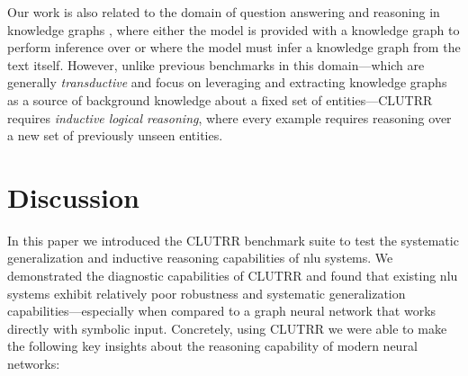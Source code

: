 \documentclass[letterpaper, 12pt]{report}
\begin{document}
Our work is also related to the domain of question answering and reasoning in knowledge graphs \citep{das2017go, xiong2018one, NIPS2018_7473, 8587330, xiong2017deeppath, welbl2018constructing, kartsaklis2018mapping}, where either the model is provided with a knowledge graph to perform inference over or where the model must infer a knowledge graph from the text itself.
However, unlike previous benchmarks in this domain---which are generally {\em transductive} and focus on leveraging and extracting knowledge graphs as a source of background knowledge about a fixed set of entities---CLUTRR requires {\em inductive logical reasoning}, where every example requires reasoning over a new set of previously unseen entities.


\section{Discussion}
\label{sec:clutrr_discussion}

In this paper we introduced the CLUTRR benchmark suite to test the systematic generalization and inductive reasoning capabilities of \acrshort{nlu} systems.
We demonstrated the diagnostic capabilities of CLUTRR and found that existing \acrshort{nlu} systems exhibit relatively poor robustness and systematic generalization capabilities---especially when compared to a graph neural network that works directly with symbolic input.
Concretely, using CLUTRR we were able to make the following key insights about the reasoning capability of modern neural networks:
\end{document}

